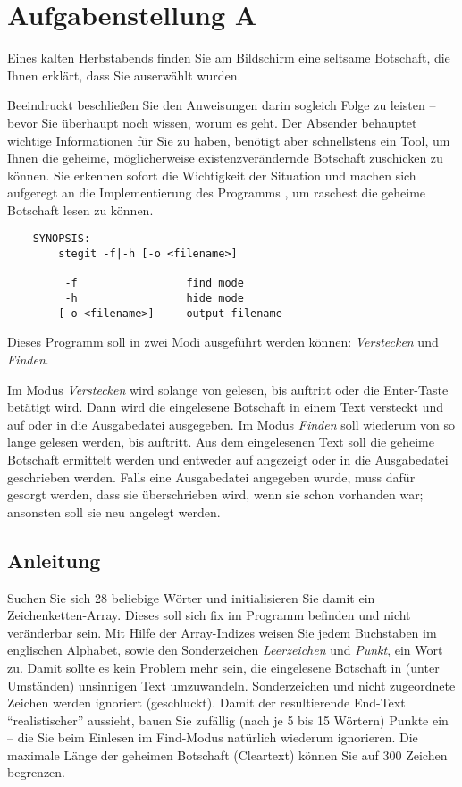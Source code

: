 




\section*{Aufgabenstellung A}

Eines kalten Herbstabends finden Sie am Bildschirm eine seltsame Botschaft, die
Ihnen erklärt, dass Sie auserwählt wurden.

Beeindruckt beschließen Sie den Anweisungen darin sogleich Folge zu leisten --
bevor Sie überhaupt noch wissen, worum es geht. Der Absender behauptet wichtige
Informationen für Sie zu haben, benötigt aber schnellstens ein Tool, um Ihnen
die geheime, möglicherweise existenzverändernde Botschaft zuschicken zu können.
Sie erkennen sofort die Wichtigkeit der Situation und machen sich aufgeregt an
die Implementierung des Programms , um raschest die geheime
Botschaft lesen zu können.

\begin{verbatim}
    SYNOPSIS:
        stegit -f|-h [-o <filename>]

         -f                 find mode
         -h                 hide mode
        [-o <filename>]     output filename
\end{verbatim}

Dieses Programm soll in zwei Modi ausgeführt werden können: \emph{Verstecken}
und \emph{Finden}.

Im Modus \emph{Verstecken} wird solange von  gelesen, bis
 auftritt oder die Enter-Taste betätigt wird. Dann wird die
eingelesene Botschaft in einem Text versteckt und auf 
oder in die Ausgabedatei ausgegeben. Im Modus \emph{Finden} soll wiederum von
 so lange gelesen werden, bis  auftritt.
Aus dem eingelesenen Text soll die geheime Botschaft ermittelt werden und
entweder auf  angezeigt oder in die Ausgabedatei
geschrieben werden. Falls eine Ausgabedatei angegeben wurde, muss dafür gesorgt
werden, dass sie überschrieben wird, wenn sie schon vorhanden war; ansonsten
soll sie neu angelegt werden.

\subsection*{Anleitung}
Suchen Sie sich 28 beliebige Wörter und initialisieren Sie damit ein
Zeichenketten-Array. Dieses soll sich fix im Programm befinden und nicht
veränderbar sein. Mit Hilfe der Array-Indizes weisen Sie jedem Buchstaben im
englischen Alphabet, sowie den Sonderzeichen \emph{Leerzeichen} und
\emph{Punkt}, ein Wort zu. Damit sollte es kein Problem mehr sein, die
eingelesene Botschaft in (unter Umständen) unsinnigen Text umzuwandeln.
Sonderzeichen und nicht zugeordnete Zeichen werden ignoriert (geschluckt). Damit
der resultierende End-Text "`realistischer"' aussieht, bauen Sie zufällig (nach
je 5 bis 15 Wörtern) Punkte ein -- die Sie beim Einlesen im Find-Modus natürlich
wiederum ignorieren.  Die maximale Länge der geheimen Botschaft (Cleartext)
können Sie auf 300 Zeichen begrenzen.

